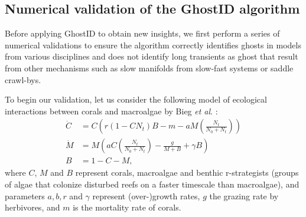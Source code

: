 \documentclass{article}
\theoremstyle{definition}
\begin{document}
\begin{refsection}
\subsection{Numerical validation of the GhostID algorithm}\label{subsec:validation}

Before applying GhostID to obtain new insights, we first perform a series of numerical validations to ensure the algorithm correctly identifies ghosts in models from various disciplines and does not identify long transients as ghost that result from other mechanisms such as slow manifolds from slow-fast systems or saddle crawl-bys.

To begin our validation, let us consider the following model of ecological interactions between corals and macroalgae by Bieg \textit{et al}. \cite{Bieg_2024}:
\begin{align}
        \dot{C} &= C \left( r(1 - C N_t) B - m - a M \left( \frac{N_t}{N_0 + N_t} \right) \right) \label{eq:bieg}\\
    \dot{M} &= M \left( a C \left( \frac{N_t}{N_0 + N_t} \right) - \frac{g}{M + B} + \gamma B \right) \nonumber\\
    B &= 1 - C - M, \nonumber
\end{align}
where $C$, $M$ and $B$ represent corals, macroalgae and benthic r-strategists (groups of algae that colonize disturbed reefs on a faster timescale than macroalgae), and parameters $a,b, r$ and $\gamma$ represent (over-)growth rates, $g$ the grazing rate by herbivores, and $m$ is the mortality rate of corals.

\end{refsection}
\end{document}
